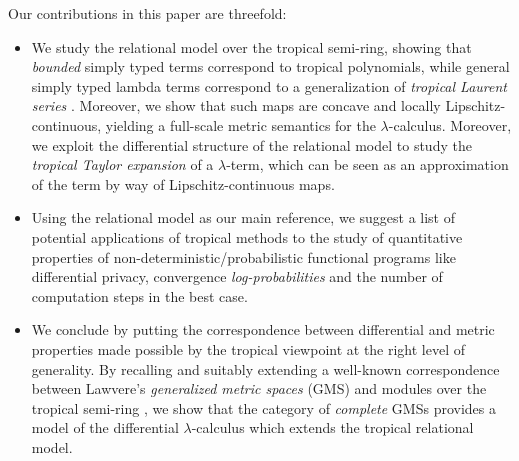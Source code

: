\documentclass[conference]{IEEEtran}
\begin{document}
Our contributions in this paper are threefold:
\begin{itemize}

\item We study the relational model over the tropical semi-ring, showing that
\emph{bounded} simply typed terms correspond to tropical polynomials, while general
 simply typed lambda terms correspond to a generalization of \emph{tropical Laurent series} \cite{}. Moreover, we show that such maps are concave and locally Lipschitz-continuous, yielding a full-scale metric semantics for the $\lambda$-calculus.
Moreover, we exploit the differential structure of the relational model to study the \emph{tropical Taylor expansion} of a $\lambda$-term, which can be seen as an approximation of the term by way of Lipschitz-continuous maps.


\item Using the relational model as our main reference, we suggest a list of potential applications of tropical methods to the study of quantitative properties of non-deterministic/probabilistic functional programs like differential privacy, convergence \emph{log-probabilities} and the number of computation steps in the best case.

\item We conclude by putting the correspondence between differential and metric properties made possible by the tropical viewpoint at the right level of generality. 
By recalling and suitably extending a well-known correspondence between Lawvere's \emph{generalized metric spaces} (GMS) \cite{} and modules over the tropical semi-ring \cite{}, we show that the category of \emph{complete}  GMSs provides a model of the differential $\lambda$-calculus which extends the tropical relational model.
\end{itemize}
%
%
%
%
%
%
%
%
%
\end{document}
